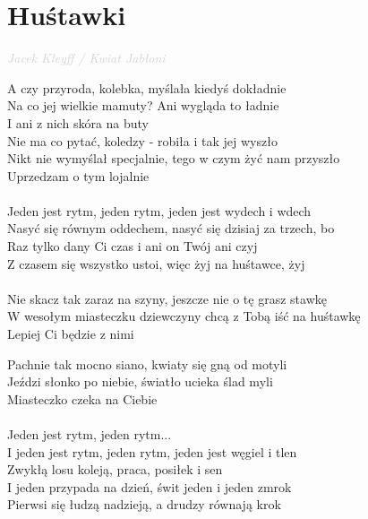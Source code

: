 \documentclass[a5paper, 10pt]{book}
\begin{document}
\section{Huśtawki}\textcolor{lightgray}{\textit{Jacek Kleyff / Kwiat Jabłoni}}\vspace*{2mm}\\
\begin{minipage}[t]{0.85\textwidth}
A czy przyroda, kolebka, myślała kiedyś dokładnie\\
Na co jej wielkie mamuty? Ani wygląda to ładnie\\
I ani z nich skóra na buty \vspace*{2mm}
\\
Nie ma co pytać, koledzy - robiła i tak jej wyszło\\
Nikt nie wymyślał specjalnie, tego w czym żyć nam przyszło\\
Uprzedzam o tym lojalnie\\
\\
\hspace*{5mm}Jeden jest rytm, jeden rytm, jeden jest wydech i wdech\\
\hspace*{5mm}Nasyć się równym oddechem, nasyć się dzisiaj za trzech, bo\\
\hspace*{5mm}Raz tylko dany Ci czas i ani on Twój ani czyj\\
\hspace*{5mm}Z czasem się wszystko ustoi, więc żyj na huśtawce, żyj\\
\\
Nie skacz tak zaraz na szyny, jeszcze nie o tę grasz stawkę\\
W wesołym miasteczku dziewczyny chcą z Tobą iść na huśtawkę\\
Lepiej Ci będzie z nimi \vspace*{2mm}

Pachnie tak mocno siano, kwiaty się gną od motyli\\
Jeździ słonko po niebie, światło ucieka ślad myli\\
Miasteczko czeka na Ciebie\\
\\
\hspace*{7mm}Jeden jest rytm, jeden rytm...\vspace*{2mm}
\\
\hspace*{5mm}I jeden jest rytm, jeden rytm, jeden jest węgiel i tlen\\
\hspace*{5mm}Zwykłą losu koleją, praca, posiłek i sen\\
\hspace*{5mm}I jeden przypada na dzień, świt jeden i jeden zmrok\\
\hspace*{5mm}Pierwsi się łudzą nadzieją, a drudzy równają krok\\
\end{minipage}
\end{document}
